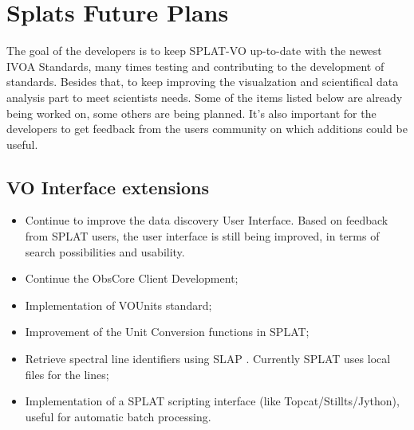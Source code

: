 \documentclass[final,authoryear,5p,times,twocolumn]{elsarticle}
\begin{document}
\section{Splats Future Plans}

The goal of the developers is to keep SPLAT-VO up-to-date with the
newest IVOA Standards, many times testing and contributing to the
development of standards. Besides that, to keep improving the
visualzation and scientifical data analysis part to meet scientists
needs.  Some of the items listed below are already being worked on,
some others are being planned. It's also important for the developers
to get feedback from the users community on which additions could be
useful.

\subsection{VO Interface extensions}
\begin{itemize}
\item Continue to improve the data discovery User Interface.
Based on feedback from SPLAT users, the user interface is still being
improved, in terms of search possibilities and usability.
\item Continue the ObsCore Client Development;
\item Implementation of  VOUnits \citep{vounits} standard;
\item	Improvement of the Unit Conversion functions in SPLAT;
\item Retrieve spectral line identifiers using SLAP \citep[Simple Line
  Access Protocol;][]{slap}. Currently SPLAT uses local files for the
  lines;
\item Implementation of a SPLAT scripting interface (like Topcat/Stillts/Jython), 
useful for automatic batch processing.
\end{itemize}
\end{document}

